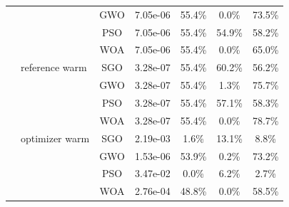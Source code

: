 \begin{table}[htbp]
{\begin{tabular}{@{}llccccc@{}}
 &  & GWO & 7.05e-06 & 55.4\% & 0.0\% & 73.5\% \\
 &  & PSO & 7.05e-06 & 55.4\% & 54.9\% & 58.2\% \\
 &  & WOA & 7.05e-06 & 55.4\% & 0.0\% & 65.0\% \\
 & reference warm & SGO & 3.28e-07 & 55.4\% & 60.2\% & 56.2\% \\
 &  & GWO & 3.28e-07 & 55.4\% & 1.3\% & 75.7\% \\
 &  & PSO & 3.28e-07 & 55.4\% & 57.1\% & 58.3\% \\
 &  & WOA & 3.28e-07 & 55.4\% & 0.0\% & 78.7\% \\
 & optimizer warm & SGO & 2.19e-03 & 1.6\% & 13.1\% & 8.8\% \\
 &  & GWO & 1.53e-06 & 53.9\% & 0.2\% & 73.2\% \\
 &  & PSO & 3.47e-02 & 0.0\% & 6.2\% & 2.7\% \\
 &  & WOA & 2.76e-04 & 48.8\% & 0.0\% & 58.5\% \\
\bottomrule
\end{tabular}}
\end{table}
